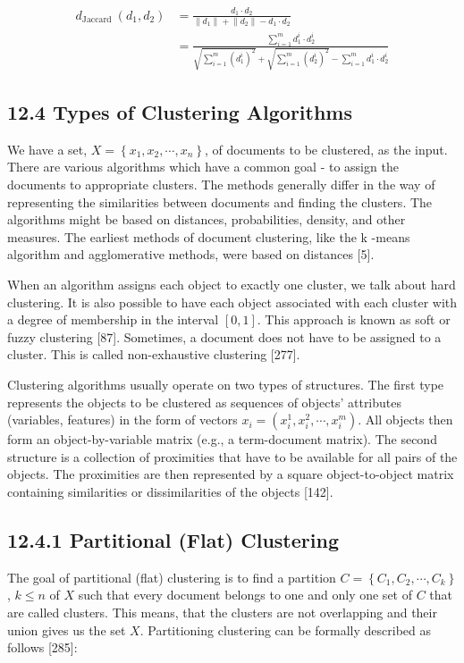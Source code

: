 \documentclass[10pt]{book}
\begin{document}
\begin{align*}
d_{\text {Jaccard }}\left(d_{1}, d_{2}\right) & =\frac{d_{1} \cdot d_{2}}{\left\|d_{1}\right\|+\left\|d_{2}\right\|-d_{1} \cdot d_{2}} \\
& =\frac{\sum_{i=1}^{m} d_{1}^{i} \cdot d_{2}^{i}}{\sqrt{\sum_{i=1}^{m}\left(d_{1}^{i}\right)^{2}}+\sqrt{\sum_{i=1}^{m}\left(d_{2}^{i}\right)^{2}}-\sum_{i=1}^{m} d_{1}^{i} \cdot d_{2}^{i}} \tag{12.11}
\end{align*}


\subsection*{12.4 Types of Clustering Algorithms}
We have a set, $X=\left\{x_{1}, x_{2}, \cdots, x_{n}\right\}$, of documents to be clustered, as the input. There are various algorithms which have a common goal - to assign the documents to appropriate clusters. The methods generally differ in the way of representing the similarities between documents and finding the clusters. The algorithms might be based on distances, probabilities, density, and other measures. The earliest methods of document clustering, like the k -means algorithm and agglomerative methods, were based on distances [5].

When an algorithm assigns each object to exactly one cluster, we talk about hard clustering. It is also possible to have each object associated with each cluster with a degree of membership in the interval $[0,1]$. This approach is known as soft or fuzzy clustering [87]. Sometimes, a document does not have to be assigned to a cluster. This is called non-exhaustive clustering [277].

Clustering algorithms usually operate on two types of structures. The first type represents the objects to be clustered as sequences of objects' attributes (variables, features) in the form of vectors $x_{i}=\left(x_{i}^{1}, x_{i}^{2}, \cdots, x_{i}^{m}\right)$. All objects then form an object-by-variable matrix (e.g., a term-document matrix). The second structure is a collection of proximities that have to be available for all pairs of the objects. The proximities are then represented by a square object-to-object matrix containing similarities or dissimilarities of the objects [142].

\subsection*{12.4.1 Partitional (Flat) Clustering}
The goal of partitional (flat) clustering is to find a partition $C=\left\{C_{1}, C_{2}, \cdots, C_{k}\right\}$, $k \leq n$ of $X$ such that every document belongs to one and only one set of $C$ that are called clusters. This means, that the clusters are not overlapping and their union gives us the set $X$. Partitioning clustering can be formally described as follows [285]:
\end{document}
